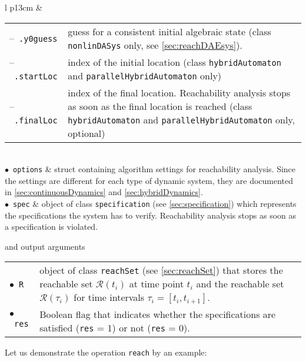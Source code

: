 \begin{center}
\renewcommand{\arraystretch}{1.3}
\begin{tabular}[t]{l p{13cm} }
	& \begin{tabular}[t]{l p{10cm}}	
	    --~\texttt{.y0guess} & guess for a consistent initial algebraic state (class \texttt{nonlinDASys} only, see \cref{sec:reachDAEsys}). \\
	 	--~\texttt{.startLoc} & index of the initial location (class \texttt{hybridAutomaton} and \texttt{parallelHybridAutomaton} only)\\
	 	--~\texttt{.finalLoc} & index of the final location. Reachability analysis stops as soon as the final location is reached (class \texttt{hybridAutomaton} and \texttt{parallelHybridAutomaton} only, optional)
	 \end{tabular} \\
	$\bullet$~\texttt{options} & struct containing algorithm settings for reachability analysis. Since the settings are different for each type of dynamic system, they are documented in \cref{sec:continuousDynamics} and \cref{sec:hybridDynamics}. \\
	$\bullet$~\texttt{spec} & object of class \texttt{specification} (see \cref{sec:specification}) which represents the specifications the system has to verify. Reachability analysis stops as soon as a specification is violated.
\end{tabular}
\end{center}

and output arguments

\begin{center}
\renewcommand{\arraystretch}{1.3}
\begin{tabular}[t]{l p{13cm} }
	$\bullet$~\texttt{R} & object of class \texttt{reachSet} (see \cref{sec:reachSet}) that stores the reachable set $\mathcal{R}(t_i)$ at time point $t_i$ and the reachable set $\mathcal{R}(\tau_i)$ for time intervals $\tau_i = [t_i,t_{i+1}]$. \\
	$\bullet$~\texttt{res} & Boolean flag that indicates whether the specifications are satisfied (\texttt{res} = 1) or not (\texttt{res} = 0).
\end{tabular}
\end{center}


Let us demonstrate the operation \texttt{reach} by an example:

\begin{center}
\begin{minipage}[t]{0.58\textwidth}
	\footnotesize
	
\end{minipage}
\begin{minipage}[t]{0.4\textwidth}
	\vspace{0pt}
	\centering
\end{minipage}
\end{center}
